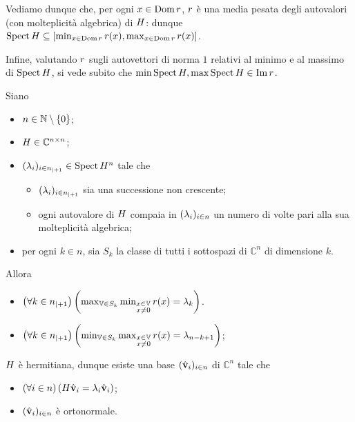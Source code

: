 \par Vediamo dunque che, per ogni $x \in \operatorname{Dom}{r}$, $r$ \`e una media pesata degli autovalori (con molteplicit\`a algebrica) di $H$: dunque
$\operatorname{Spect}{H} \subseteq [\min_{x \in \operatorname{Dom}{r}} r(x),\max_{x \in \operatorname{Dom}{r}} r(x)]$.
\par Infine, valutando $r$ sugli autovettori di norma $1$ relativi al minimo e al massimo di $\operatorname{Spect}{H}$, si vede subito che $\min \operatorname{Spect}{H}, \max \operatorname{Spect}{H} \in \operatorname{Im}{r}$. \EndProof 
\begin{Theorem}
	 Siano
	\begin{itemize}
		\item $n \in \mathbb{N} \setminus \lbrace 0 \rbrace$;
		\item $H \in \mathbb{C}^{n \times n}$;
		\item $(\lambda_i)_{i \in {n}_{|+ 1}} \in \operatorname{Spect}{H}^n$ tale che
		\begin{itemize}
			\item $(\lambda_i)_{i \in {n}_{|+ 1}}$ sia una successione non crescente;
			\item ogni autovalore di $H$ compaia in $(\lambda_i)_{i \in n}$ un numero di volte pari alla sua molteplicit\`a algebrica;
		\end{itemize}
		\item per ogni $k \in n$, sia $S_k$ la classe di tutti i sottospazi di $\mathbb{C}^n$ di dimensione $k$.
	\end{itemize}
	Allora
	\begin{itemize}
		\item $\left ( \forall k \in {n}_{|+ 1} \right ) \left ( \max_{\mathbb{V} \in S_k} \min_{\substack{x \in \mathbb{V}\\x \neq 0}} r(x) = \lambda_k \right )$.
		\item $\left ( \forall k \in {n}_{|+ 1} \right ) \left ( \min_{\mathbb{V} \in S_k} \max_{\substack{x \in \mathbb{V}\\x \neq 0}} r(x) = \lambda_{n - k + 1} \right )$;
	\end{itemize}
\end{Theorem}
\Proof $H$ \`e hermitiana, dunque esiste una base $(\hat{\mathbf{v}}_i)_{i \in n}$ di $\mathbb{C}^n$ tale che
\begin{itemize}
	\item $\left ( \forall i \in n \right ) \left ( H\hat{\mathbf{v}}_i = \lambda_i\hat{\mathbf{v}}_i \right )$;
	\item $(\hat{\mathbf{v}}_i)_{i \in n}$ \`e ortonormale.
\end{itemize}
